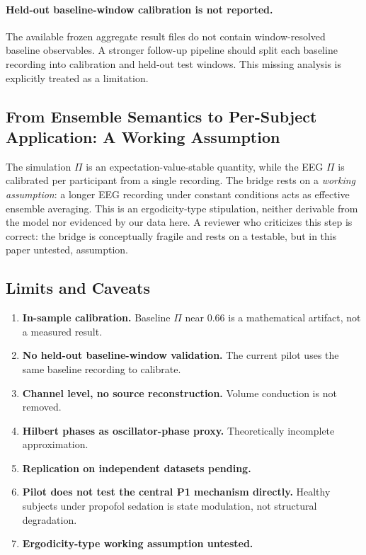\documentclass[11pt,a4paper]{article}
\theoremstyle{plain}
\theoremstyle{definition}
\theoremstyle{remark}
\begin{document}
\paragraph{Held-out baseline-window calibration is not reported.}
The available frozen aggregate result files do not contain window-resolved baseline observables. A stronger follow-up pipeline should split each baseline recording into calibration and held-out test windows. This missing analysis is explicitly treated as a limitation.

\subsection{From Ensemble Semantics to Per-Subject Application: A Working Assumption}
\label{sec:pilot-bridge}

The simulation $\Pi$ is an expectation-value-stable quantity, while the EEG $\Pi$ is calibrated per participant from a single recording. The bridge rests on a \emph{working assumption}: a longer EEG recording under constant conditions acts as effective ensemble averaging. This is an ergodicity-type stipulation, neither derivable from the model nor evidenced by our data here. A reviewer who criticizes this step is correct: the bridge is conceptually fragile and rests on a testable, but in this paper untested, assumption.

\subsection{Limits and Caveats}
\label{sec:pilot-limits}

\begin{enumerate}
\item \textbf{In-sample calibration.} Baseline $\Pi$ near $0.66$ is a mathematical artifact, not a measured result.
\item \textbf{No held-out baseline-window validation.} The current pilot uses the same baseline recording to calibrate.
\item \textbf{Channel level, no source reconstruction.} Volume conduction is not removed.
\item \textbf{Hilbert phases as oscillator-phase proxy.} Theoretically incomplete approximation.
\item \textbf{Replication on independent datasets pending.}
\item \textbf{Pilot does not test the central P1 mechanism directly.} Healthy subjects under propofol sedation is state modulation, not structural degradation.
\item \textbf{Ergodicity-type working assumption untested.}
\end{enumerate}
\end{document}
